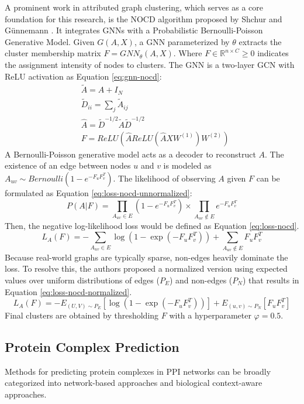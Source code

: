 A prominent work in attributed graph clustering, which serves as a core foundation for this research, is the NOCD algorithm proposed by Shchur and Günnemann \cite{nocd2019}. It integrates GNNs with a Probabilistic Bernoulli-Poisson Generative Model. Given $G(A, X)$, a GNN parameterized by $\theta$ extracts the cluster membership matrix $F = GNN_{\theta}(A, X)$. Where $F \in \mathbb{R}^{n \times C}\ge 0$ indicates the assignment intensity of nodes to clusters. The GNN is a two-layer GCN with ReLU activation as Equation \ref{eq:gnn-nocd}:
\begin{equation}
	\begin{aligned}
		& \tilde{A} = A + I_N \\
		& \tilde{D}_{ii} = \sum_{j} \tilde{A}_{ij} \\
		& \hat{A} = \tilde{D}^{-1/2}\tilde{A}\tilde{D}^{-1/2} \\
		& F = ReLU(\hat{A}ReLU(\hat{A}XW^{(1)})W^{(2)})
	\end{aligned}
	\label{eq:gnn-nocd}
\end{equation}
A Bernoulli-Poisson generative model acts as a decoder to reconstruct $A$. The existence of an edge between nodes $u$ and $v$ is modeled as $A_{uv} \sim Bernoulli(1-e^{-F_uF_v^T})$. The likelihood of observing $A$ given $F$ can be formulated as Equation \ref{eq:loss-nocd-unnormalized}:
\begin{equation}
	P(A|F) = \prod_{A_{uv}\in E} (1-e^{-F_uF_v^T}) \times \prod_{A_{uv}\notin E} e^{-F_uF_v^T}
	\label{eq:loss-nocd-unnormalized}
\end{equation}
Then, the negative log-likelihood loss would be defined as Equation \ref{eq:loss-nocd}.
\begin{equation}
	L_{A}(F) = -\sum_{A_{uv}\in E} \log(1-\exp(-F_uF_v^T)) + \sum_{A_{uv}\notin E} F_uF_v^T
	\label{eq:loss-nocd}
\end{equation}
Because real-world graphs are typically sparse, non-edges heavily dominate the loss. To resolve this, the authors proposed a normalized version using expected values over uniform distributions of edges ($P_E$) and non-edges ($P_N$) that results in Equation \ref{eq:loss-nocd-normalized}.
\begin{equation}
	L_{A}(F) = -E_{(U,V)\sim P_E}[\log(1-\exp(-F_uF_v^T))] + E_{(u,v)\sim P_N}[F_uF_v^T]
	\label{eq:loss-nocd-normalized}
\end{equation}
Final clusters are obtained by thresholding $F$ with a hyperparameter $\varphi=0.5$.

\subsection{Protein Complex Prediction}
Methods for predicting protein complexes in PPI networks can be broadly categorized into network-based approaches and biological context-aware approaches.

